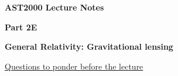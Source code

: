 



\vspace*{2cm}

{\centerline{\bf\huge AST2000 Lecture Notes}}

\vspace*{1cm}

\newcommand{\PartName}{2E}
\newcommand{\refproblem}[1]{\PartName.\ref{#1}}


{\centerline{\bf\LARGE Part \PartName}}\vspace*{0.25cm}
{\centerline{\bf\LARGE General Relativity: Gravitational lensing}}

\vspace*{1cm}

{\centerline{\underline{\LARGE Questions to ponder before the lecture}}}

\vspace*{1cm}

